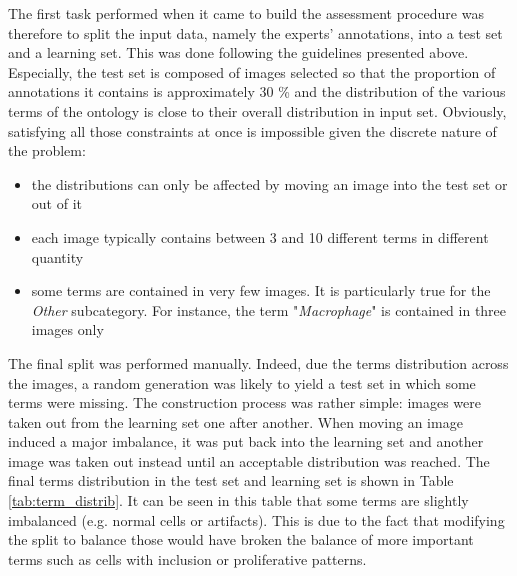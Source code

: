 The first task performed when it came to build the assessment procedure was therefore to split the input data, namely the experts' annotations, into a test set and a learning set. This was done following the guidelines presented above. Especially, the test set is composed of images selected so that the proportion of annotations it contains is approximately 30 \% and the distribution of the various terms of the ontology is close to their overall distribution in input set. Obviously, satisfying all those constraints at once is impossible given the discrete nature of the problem:

\begin{itemize}
	\item the distributions can only be affected by moving an image into the test set or out of it
	\item each image typically contains between 3 and 10 different terms in different quantity
	\item some terms are contained in very few images. It is particularly true for the \textit{Other} subcategory. For instance, the term "\textit{Macrophage}" is contained in three images only
\end{itemize}

The final split was performed manually. Indeed, due the terms distribution across the images, a random generation was likely to yield a test set in which some terms were missing. The construction process was rather simple: images were taken out from the learning set one after another. When moving an image induced a major imbalance, it was put back into the learning set and another image was taken out instead until an acceptable distribution was reached. The final terms distribution in the test set and learning set is shown in Table \ref{tab:term_distrib}. It can be seen in this table that some terms are slightly imbalanced (e.g. normal cells or artifacts). This is due to the fact that modifying the split to balance those would have broken the balance of more important terms such as cells with inclusion or proliferative patterns. 

